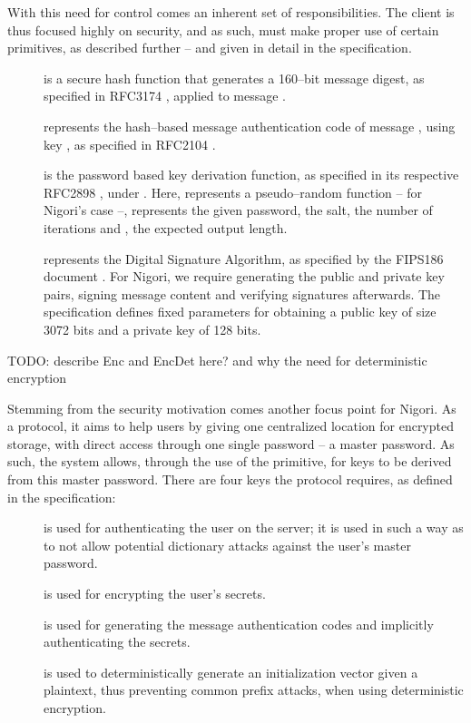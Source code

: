 With this need for control comes an inherent set of responsibilities.
The client is thus focused highly on security, and as such, must make proper use of certain primitives, as described further -- and given in detail in the specification.
\begin{description}
  \item[] is a secure hash function that generates a 160--bit message digest, as specified in RFC3174 \cite{RFC3174}, applied to message .
  \item[] represents the hash--based message authentication code of message , using key , as specified in RFC2104 \cite{RFC2104}.
  \item[] is the password based key derivation function, as specified in its respective RFC2898 \cite{RFC2898}, under .
  Here,  represents a pseudo--random function --  for Nigori's case --,  represents the given password,  the salt,  the number of iterations and , the expected output length.
  \item[] represents the Digital Signature Algorithm, as specified by the FIPS186 document \cite{DSA}.
  For Nigori, we require generating the public and private key pairs, signing message content and verifying signatures afterwards.
  The specification defines fixed parameters for obtaining a public key of size 3072 bits and a private key of 128 bits.
\end{description}

TODO: describe Enc and EncDet here? and why the need for deterministic encryption

Stemming from the security motivation comes another focus point for Nigori.
As a protocol, it aims to help users by giving one centralized location for encrypted storage, with direct access through one single password -- a master password.
As such, the system allows, through the use of the  primitive, for keys to be derived from this master password.
There are four keys the protocol requires, as defined in the specification:
\begin{description}
  \item[] is used for authenticating the user on the server; it is used in such a way as to not allow potential dictionary attacks against the user's master password.
  \item[] is used for encrypting the user's secrets.
  \item[] is used for generating the message authentication codes and implicitly authenticating the secrets.
  \item[] is used to deterministically generate an initialization vector given a plaintext, thus preventing common prefix attacks, when using deterministic encryption.
\end{description}

